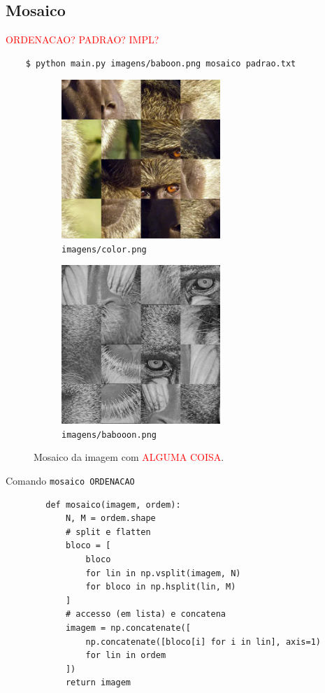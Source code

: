 \subsection{Mosaico} \label{sec:mosaico}

\textcolor{red}{ORDENACAO? PADRAO? IMPL?}

\begin{verbatim}
    $ python main.py imagens/baboon.png mosaico padrao.txt
\end{verbatim}

\begin{figure}[H]
    \centering
    \begin{subfigure}{0.45\textwidth}
        \centering
        \includegraphics[width=6cm]{resultados/colormsc.png}
        \caption{\texttt{imagens/color.png}}
    \end{subfigure}%
    \begin{subfigure}{0.45\textwidth}
        \centering
        \includegraphics[width=6cm]{resultados/baboonmsc.png}
        \caption{\texttt{imagens/babooon.png}}
        \label{fig:res:10}
    \end{subfigure}

    \caption{Mosaico da imagem com \textcolor{red}{ALGUMA COISA}.}
\end{figure}

\begin{listing}[H]
    \caption{Comando \texttt{mosaico ORDENACAO}}

    \begin{verbatim}
        def mosaico(imagem, ordem):
            N, M = ordem.shape
            # split e flatten
            bloco = [
                bloco
                for lin in np.vsplit(imagem, N)
                for bloco in np.hsplit(lin, M)
            ]
            # accesso (em lista) e concatena
            imagem = np.concatenate([
                np.concatenate([bloco[i] for i in lin], axis=1)
                for lin in ordem
            ])
            return imagem
    \end{verbatim}
\end{listing}
